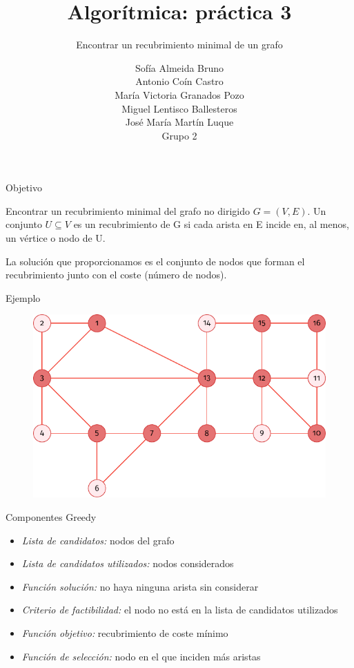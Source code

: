 \documentclass[spanish]{beamer}
\title{Algorítmica: práctica 3}
\subtitle{Encontrar un recubrimiento minimal de un grafo}
\author{Sofía Almeida Bruno\\ Antonio Coín Castro\\ María Victoria Granados Pozo\\ Miguel Lentisco Ballesteros\\ José María Martín Luque\\ \vspace{1em}Grupo 2}
\begin{document}
\maketitle

\begin{frame}{Objetivo}

	Encontrar un recubrimiento minimal del grafo no dirigido $G = (V, E)$.
	Un conjunto $U \subseteq V$ es un recubrimiento de G si cada arista en E incide en, al menos, un vértice o nodo de U.

	La solución que proporcionamos es el conjunto de nodos que forman el recubrimiento junto con el coste (número de nodos).
\end{frame}

\begin{frame}{Ejemplo}
	\begin{figure}[H]
		\centering \includegraphics{./img/grafo.pdf}
	\end{figure}
\end{frame}

\begin{frame}{Componentes Greedy}
	\begin{itemize}
		\item \textit{Lista de candidatos:} nodos del grafo
		\item \textit{Lista de candidatos utilizados:} nodos considerados
		\item \textit{Función solución:} no haya ninguna arista sin considerar
		\item \textit{Criterio de factibilidad:} el nodo no está en la lista de candidatos utilizados
		\item \textit{Función objetivo:} recubrimiento de coste mínimo
		\item \textit{Función de selección:} nodo en el que inciden más aristas
	\end{itemize}
\end{frame}
\end{document}
